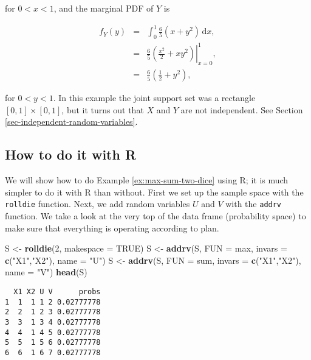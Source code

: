 \documentclass[]{book}
\newenvironment{Shaded}{\begin{snugshade}}{\end{snugshade}}
\newcommand{\KeywordTok}[1]{\textcolor[rgb]{0.13,0.29,0.53}{\textbf{{#1}}}}
\newcommand{\DataTypeTok}[1]{\textcolor[rgb]{0.13,0.29,0.53}{{#1}}}
\newcommand{\DecValTok}[1]{\textcolor[rgb]{0.00,0.00,0.81}{{#1}}}
\newcommand{\StringTok}[1]{\textcolor[rgb]{0.31,0.60,0.02}{{#1}}}
\newcommand{\OtherTok}[1]{\textcolor[rgb]{0.56,0.35,0.01}{{#1}}}
\newcommand{\NormalTok}[1]{{#1}}
\numberwithin{equation}{chapter}
\numberwithin{figure}{chapter}
\theoremstyle{plain}
\theoremstyle{definition}
\theoremstyle{remark}
\theoremstyle{definition}
\theoremstyle{definition}
\theoremstyle{remark}
\begin{document}
for \(0 < x < 1\), and the marginal PDF of \(Y\) is

\begin{eqnarray*}
f_{Y}(y) & = & \int_{0}^{1}\frac{6}{5}\left(x+y^{2}\right)\,\mathrm{d} x,\\
 & = & \left.\frac{6}{5}\left(\frac{x^{2}}{2}+xy^{2}\right)\right|_{x=0}^{1},\\
 & = & \frac{6}{5}\left(\frac{1}{2}+y^{2}\right),
\end{eqnarray*}

for \(0 < y < 1\). In this example the joint support set was a rectangle
\([0,1]\times[0,1]\), but it turns out that \(X\) and \(Y\) are not
independent. See Section \ref{sec-independent-random-variables}.

\subsection{How to do it with R}\label{how-to-do-it-with-r-20}

We will show how to do Example \ref{ex:max-sum-two-dice} using R; it is
much simpler to do it with R than without. First we set up the sample
space with the \texttt{rolldie} function. Next, we add random variables
\(U\) and \(V\) with the \texttt{addrv} function. We take a look at the
very top of the data frame (probability space) to make sure that
everything is operating according to plan.

\begin{Shaded}
\begin{Highlighting}[]
\NormalTok{S <-}\StringTok{ }\KeywordTok{rolldie}\NormalTok{(}\DecValTok{2}\NormalTok{, }\DataTypeTok{makespace =} \OtherTok{TRUE}\NormalTok{)}
\NormalTok{S <-}\StringTok{ }\KeywordTok{addrv}\NormalTok{(S, }\DataTypeTok{FUN =} \NormalTok{max, }\DataTypeTok{invars =} \KeywordTok{c}\NormalTok{(}\StringTok{"X1"}\NormalTok{,}\StringTok{"X2"}\NormalTok{), }\DataTypeTok{name =} \StringTok{"U"}\NormalTok{)}
\NormalTok{S <-}\StringTok{ }\KeywordTok{addrv}\NormalTok{(S, }\DataTypeTok{FUN =} \NormalTok{sum, }\DataTypeTok{invars =} \KeywordTok{c}\NormalTok{(}\StringTok{"X1"}\NormalTok{,}\StringTok{"X2"}\NormalTok{), }\DataTypeTok{name =} \StringTok{"V"}\NormalTok{)}
\KeywordTok{head}\NormalTok{(S)}
\end{Highlighting}
\end{Shaded}

\begin{verbatim}
  X1 X2 U V      probs
1  1  1 1 2 0.02777778
2  2  1 2 3 0.02777778
3  3  1 3 4 0.02777778
4  4  1 4 5 0.02777778
5  5  1 5 6 0.02777778
6  6  1 6 7 0.02777778
\end{verbatim}
\end{document}
